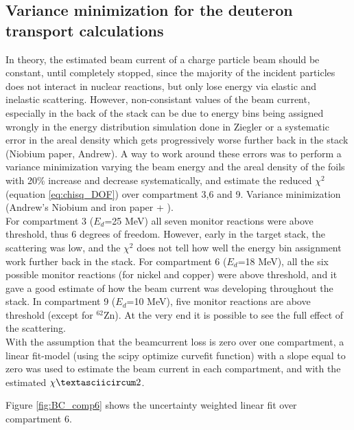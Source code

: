 \subsection{Variance minimization for the deuteron transport calculations}
In theory, the estimated beam current of a charge particle beam should be constant, until completely stopped, since the majority of the incident particles does not interact in nuclear reactions, but only lose energy via elastic and inelastic scattering. However, non-consistant values of the beam current, especially in the back of the stack can be due to energy bins being assigned wrongly in the energy distribution simulation done in Ziegler or a systematic error in the areal density which gets progressively worse further back in the stack (Niobium paper, Andrew). A way to work around these errors was to perform a variance minimization varying the beam energy and the areal density of the foils with 20\% increase and decrease systematically, and estimate the reduced $\chi^2$ (equation \ref{eq:chisq_DOF}) over compartment 3,6 and 9. Variance minimization (Andrew's Niobium and iron paper + ). \\

 For compartment 3 ($E_d$=25 MeV) all seven monitor reactions were above threshold,  thus 6 degrees of freedom.  However,  early in the target stack,  the scattering was low, and the $\chi^2$ does not tell how well the energy bin assignment work further back in the stack.  For compartment 6 ($E_d$=18 MeV), all the six possible monitor reactions (for nickel and copper) were above threshold, and it gave a good estimate of how the beam current was developing throughout the stack.  In compartment 9 ($E_d$=10 MeV), five monitor reactions are above threshold (except for $^{62}$Zn).  At the very end it is possible to see the full effect of the scattering.\\

With the assumption that the beamcurrent loss is zero over one compartment, a linear fit-model (using the scipy optimize curvefit function) with a slope equal to zero was used to estimate the beam current in each compartment, and with the estimated $\chiˆ2$.  

Figure \ref{fig:BC_comp6} shows the uncertainty weighted linear fit over compartment 6. 


